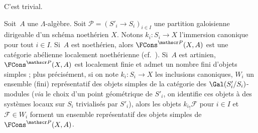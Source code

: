 \documentclass[10pt]{../fichiers-configuration-latex/smfart}
\begin{document}
C'est trivial.

\begin{proposition2}\label{17-proposition-objets-simples-faiblement-constructibles}
Soit $A$ une $\Lambda$-algèbre.
Soit $\mathscr P=(S'_i\to S_i)_{i\in I}$ une partition
galoisienne dirigeable d'un schéma noethérien $X$. Notons $k_i\colon S_i\to
X$ l'immersion canonique pour tout $i\in I$.
Si $A$ est noethérien, alors $\FCons^{\mathscr P}(X,A)$ est une catégorie
abélienne localement noethérienne (cf.~\cite[pages~325--326]{CA@Gabriel}).
Si $A$ est artinien, $\FCons^{\mathscr
P}(X,A)$ est localement finie et admet un nombre fini d'objets simples ;
plus précisément, si on note $k_i\colon S_i\to X$ les inclusions
canoniques, $W_i$ un ensemble (fini) représentatif des objets simples de la
catégorie des $\Gal(S'_i/S_i)$-modules (\emph{via} le choix d'un point
géométrique de $S'_i$, on identifie ces objets à des systèmes locaux sur
$S_i$ trivialisés par $S'_i$), alors les objets ${k_i}_!\mathscr F$ pour
$i\in I$ et $\mathscr F\in W_i$ forment un ensemble représentatif des
objets simples de $\FCons^{\mathscr P}(X,A)$.
\end{proposition2}
\end{document}
